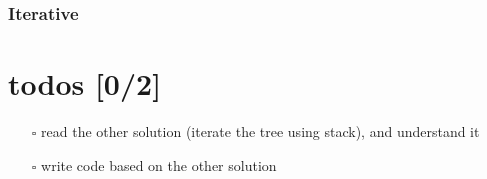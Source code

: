 \documentclass[12pt]{book}
\begin{document}
\subsubsection{Iterative}
\label{sec:org9021286}
\section{todos [0/2]}
\label{sec:org8bcad30}
\begin{itemize}
\item[{$\square$}] read the other solution (iterate the tree using stack), and understand it
\item[{$\square$}] write code based on the other solution
\end{itemize}
\end{document}
